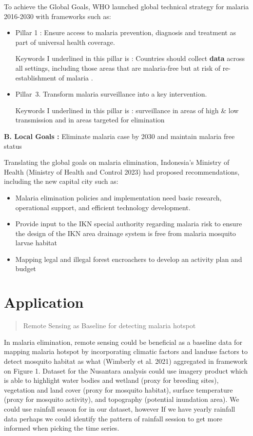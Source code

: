 \documentclass[
  letterpaper,
  DIV=11,
  numbers=noendperiod]{scrreprt}
\begin{document}
To achieve the Global Goals, WHO launched global technical strategy for
malaria 2016-2030 with frameworks such as:

\begin{itemize}
\item
  Pillar 1 : Ensure access to malaria prevention, diagnosis and
  treatment as part of universal health coverage.

  Keywords I underlined in this pillar is : Countries should collect
  \textbf{data} across all settings, including those areas that are
  malaria-free but at risk of re-establishment of malaria .
\item
  Pillar~3. Transform malaria surveillance into a key intervention.

  Keywords I underlined in this pillar is : surveillance in areas of
  high \& low transmission and in areas targeted for elimination
\end{itemize}

\textbf{B. Local Goals :} Eliminate malaria case by 2030 and maintain
malaria free status

Translating the global goals on malaria elimination, Indonesia's
Ministry of Health (Ministry of Health and Control 2023) had proposed
recommendations, including the new capital city such as:

\begin{itemize}
\item
  Malaria elimination policies and implementation need basic research,
  operational support, and efficient technology development.
\item
  Provide input to the IKN special authority regarding malaria risk to
  ensure the design of the IKN area drainage system is free from malaria
  mosquito larvae habitat
\item
  Mapping legal and illegal forest encroachers to develop an activity
  plan and budget
\end{itemize}

\hypertarget{application-2}{%
\section{Application}\label{application-2}}

\begin{quote}
Remote Sensing as Baseline for detecting malaria hotspot
\end{quote}

In malaria elimination, remote sensing could be beneficial as a baseline
data for mapping malaria hotspot by incorporating climatic factors and
landuse factors to detect mosquito habitat as what (Wimberly et al.
2021) aggregated in framework on Figure 1. Dataset for the Nusantara
analysis could use imagery product which is able to highlight water
bodies and wetland (proxy for breeding sites), vegetation and land cover
(proxy for mosquito habitat), surface temperature (proxy for mosquito
activity), and topography (potential inundation area). We could use
rainfall season for in our dataset, however If we have yearly rainfall
data perhaps we could identify the pattern of rainfall session to get
more informed when picking the time series.
\end{document}

